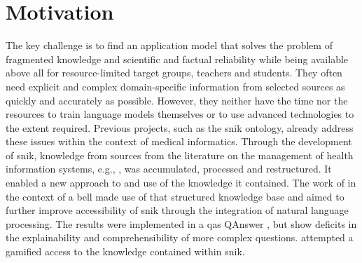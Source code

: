 \section{Motivation}\label{sec:motivation}
The key challenge is to find an application model that solves the problem of fragmented knowledge and scientific and factual reliability while being available above all for resource-limited target groups, teachers and students.
They often need explicit and complex domain-specific information from selected sources as quickly and accurately as possible. 
However, they neither have the time nor the resources to train language models themselves or to use advanced technologies to the extent required.
%
Previous projects, such as the \ac{snik} ontology, already address these issues within the context of medical informatics.
Through the development of \ac{snik}, knowledge from sources from the literature on the management of health information systems, e.g., \citet{bb2}, was accumulated, processed and restructured.    
It enabled a new approach to and use of the knowledge it contained. 
The work of \citep{hannesbell, hannesbell_skill} in the context of a \ac{bell} made use of that structured knowledge base and aimed to further improve accessibility of \ac{snik} through the integration of natural language processing.    
The results were implemented in a \ac{qas} QAnswer \citep{qanswer}, but show deficits in the explainability and comprehensibility of more complex questions. 
\citep{snikquiz} attempted a gamified access to the knowledge contained within \ac{snik}. 
